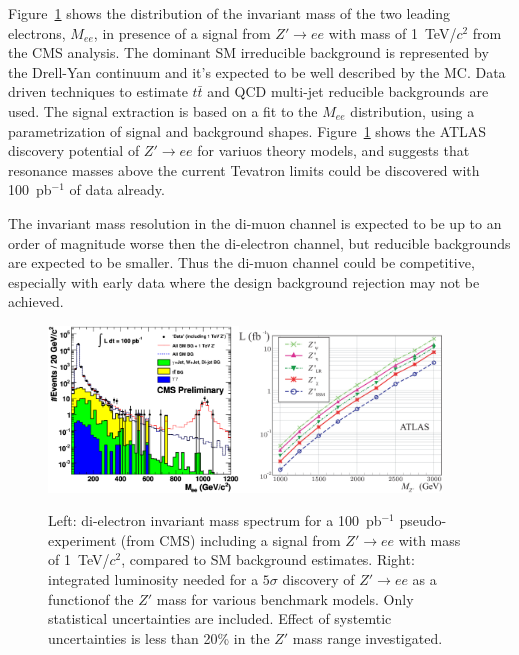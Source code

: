 \documentclass{cimento}
\begin{document}
Figure~\ref{fig:MeeAndZPrimeDisc} shows the distribution of the invariant mass 
of the two leading electrons, $M_{ee}$, in presence of 
a signal from $Z' \rightarrow ee$ with mass of 1~TeV/$c^2$ from the CMS analysis. 
The dominant SM irreducible background is represented by the Drell-Yan 
continuum and it's expected to be well described by the MC.
Data driven techniques to estimate $t\bar{t}$ and QCD multi-jet
reducible backgrounds are used. The signal extraction is based on a fit 
to the $M_{ee}$ distribution, using a parametrization of signal and 
background shapes. Figure~\ref{fig:MeeAndZPrimeDisc}
shows the ATLAS discovery potential of $Z' \rightarrow ee$
for variuos theory models, and suggests that resonance masses 
above the current Tevatron limits could be discovered with 
100~pb$^{-1}$ of data already. 

The invariant mass resolution in the di-muon channel is expected to be up to an 
order of magnitude worse then the di-electron channel, but reducible backgrounds
are expected to be smaller. Thus the di-muon channel could be competitive, 
especially with early data where the design background rejection may not be 
achieved.

\begin{figure}[htbp] 
\centering
\includegraphics[width=0.45\textwidth]{./st_mass_all_withZPrime_ALLTOPO.eps}\includegraphics[width=0.48\textwidth]{./fig9L.eps}
\caption{Left: di-electron invariant mass spectrum for a 
100~pb$^{-1}$ pseudo-experiment (from CMS) including a signal from 
$Z' \rightarrow ee$ with mass of 1~TeV/$c^2$, 
compared to SM background estimates. Right: integrated 
luminosity needed for a $5\sigma$ discovery of $Z' \rightarrow ee$
as a functionof the $Z'$ mass for various benchmark models. Only 
statistical uncertainties are included. 
Effect of systemtic uncertainties is less than 20\% in the $Z'$ mass
range investigated.}
\label{fig:MeeAndZPrimeDisc}
\end{figure}
\end{document}
